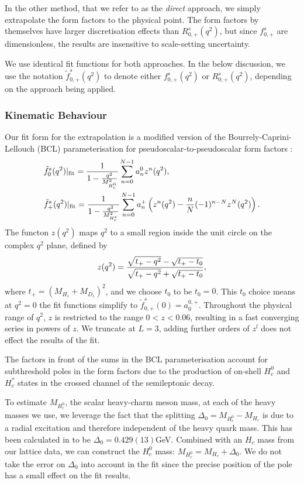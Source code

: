 In the other method, that we refer to as the {\textit{direct}} approach, we simply extrapolate the form factors to the physical point. The form factors by themselves have larger discretisation effects than $R_{0,+}^s(q^2)$, but since $f^s_{0,+}$ are dimensionless, the results are insensitive to scale-setting uncertainty.

We use identical fit functions for both approaches. In the below discussion, we use the notation $\tilde{f}^s_{0,+}(q^2)$ to denote either $f^s_{0,+}(q^2)$ or $R_{0,+}^s(q^2)$, depending on the approach being applied.

\subsubsection{Kinematic Behaviour}

Our fit form for the extrapolation is a modified version of the Bourrely-Caprini-Lellouch (BCL) parameterisation for pseudoscalar-to-pseudoscalar form factors \cite{Bourrely:2008za}:
\begin{align}
  \label{eq:BCL}
  &\tilde{f}^s_0(q^2)|_{\text{fit}} = {1\over 1 - {q^2\over M_{H_c^0}^2} } \sum_{n=0}^{N-1} a_n^0 z^n(q^2), \\
  &\tilde{f}^s_+(q^2)|_{\text{fit}} = {1\over 1 - {q^2\over M_{H_c^*}^2} } \sum_{n=0}^{N-1} a_n^+ \left( z^n(q^2) - {n\over N} (-1)^{n-N} z^N(q^2) \right). \nonumber
\end{align}
The functon $z(q^2)$ maps $q^2$ to a small region inside the unit circle on the complex $q^2$ plane, defined by
\begin{align}
  z(q^2) = {\sqrt{t_+ - q^2} - \sqrt{t_+ - t_0} \over \sqrt{t_+ - q^2} + \sqrt{t_+ - t_0} },
\end{align}
where $t_+ = (M_{H_s}+M_{D_s})^2$, and we choose $t_0$ to be $t_0 = 0$. This $t_0$ choice means at $q^2=0$ the fit functions simplify to $\tilde{f}_{0,+}^s(0) = a_0^{0,+}$. Throughout the physical range of $q^2$, $z$ is restricted to the range $0<z<0.06$, resulting in a fast converging series in powers of $z$. We truncate at $L=3$, adding further orders of $z^l$ does not effect the results of the fit.

The factors in front of the sums in the BCL parameterisation account for subthreshold poles in the form factors due to the production of on-shell $H_c^0$ and $H_c^*$ states in the crossed channel of the semileptonic decay.

To estimate $M_{H_c^0}$, the scalar heavy-charm meson mass, at each of the heavy masses we use, we leverage the fact that the splitting $\Delta_0 = M_{H_c^0} - M_{H_c}$ is due to a radial excitation and therefore independent of the heavy quark mass. This has been calculated in \cite{Dowdall:2012ab} to be $\Delta_0 = 0.429(13)$GeV. Combined with an $H_c$ mass from our lattice data, we can construct the $H_c^0$ mass: $M_{H_c^0} = M_{H_c} + \Delta_0$. We do not take the error on $\Delta_0$ into account in the fit since the precise position of the pole has a small effect on the fit results.

